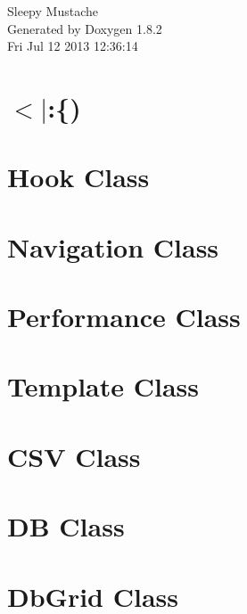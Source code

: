\documentclass{book}
\begin{document}
\hypersetup{pageanchor=false,citecolor=blue}
\begin{titlepage}
\vspace*{7cm}
\begin{center}
{\Large Sleepy Mustache }\\
\vspace*{1cm}
{\large Generated by Doxygen 1.8.2}\\
\vspace*{0.5cm}
{\small Fri Jul 12 2013 12:36:14}\\
\end{center}
\end{titlepage}
\clearemptydoublepage
{}
\tableofcontents
\clearemptydoublepage
{}
\hypersetup{pageanchor=true,citecolor=blue}
\chapter{$<$$|$\-:\{)}
\label{index}\hypertarget{index}{}
\chapter{Hook Class}
\label{hooks1}
\hypertarget{hooks1}{}

\chapter{Navigation Class}
\label{nav1}
\hypertarget{nav1}{}

\chapter{Performance Class}
\label{perf1}
\hypertarget{perf1}{}

\chapter{Template Class}
\label{template1}
\hypertarget{template1}{}

\chapter{C\-S\-V Class}
\label{csv1}
\hypertarget{csv1}{}

\chapter{D\-B Class}
\label{db1}
\hypertarget{db1}{}

\chapter{Db\-Grid Class}
\label{dbgrid1}
\hypertarget{dbgrid1}{}

\end{document}
